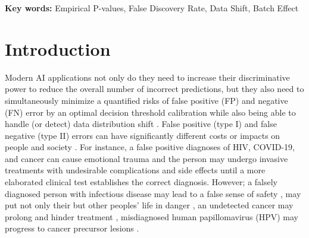 \documentclass{article}
\begin{document}
\begin{abstract}
	 


\end{abstract}
\textbf{Key words:} Empirical P-values, False Discovery Rate, Data Shift, Batch Effect

\section{Introduction}

Modern AI applications not only do they need to increase their discriminative power to reduce the overall number of incorrect predictions, but they also need to simultaneously minimize a quantified risks of false positive (FP) and negative (FN) error by an optimal decision threshold calibration while also being able to handle (or detect) data distribution shift \cite{feng2022clinical, al2023artificial}. False positive (type I) and false negative (type II) errors can have significantly different costs or impacts on people and society \cite{wynants2019three}. For instance, a false positive diagnoses of HIV, COVID-19, and cancer can cause emotional trauma and the person may undergo invasive treatments with undesirable complications and side effects \cite{newman2021rate, salz2010meta, Tosteson2014Consequences, xu2016frequency} until a more elaborated clinical test establishes the correct diagnosis. However; a falsely diagnosed person with infectious disease may lead to a false sense of safety \cite{mouliou2021false}, may put not only their but other peoples' life in danger \cite{woloshin2020false}, an undetected cancer may prolong and hinder treatment \cite{bradley2021interpreting}, misdiagnosed human papillomavirus (HPV) may progress to cancer precursor lesions \cite{macios2022false,pinsky2015principles}. 
\end{document}
